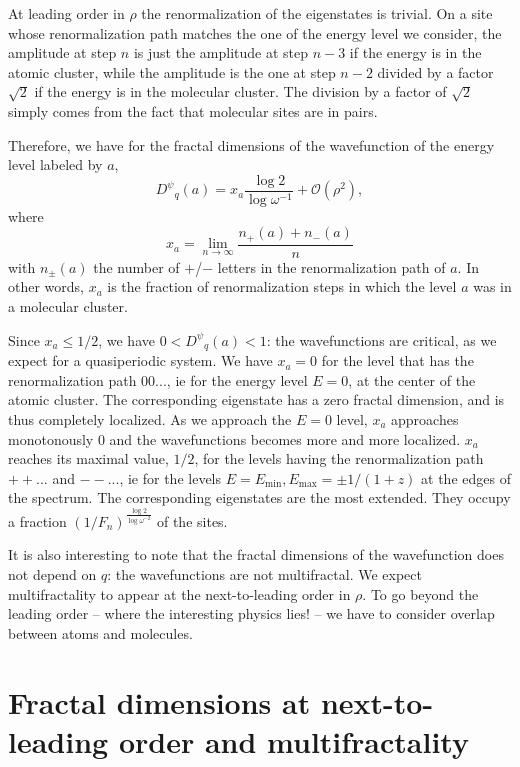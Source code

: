 \documentclass[aps,prl,preprint]{revtex4-1}
\newcommand{\wf}{\ensuremath{D^\psi}}
\begin{document}
At leading order in $\rho$ the renormalization of the eigenstates is trivial. 
On a site whose renormalization path matches the one of the energy level we consider, the amplitude at step $n$ is just the amplitude at step $n-3$ if the energy is in the atomic cluster, while the amplitude is the one at step $n-2$ divided by a factor $\sqrt{2}$ if the energy is in the molecular cluster.
The division by a factor of $\sqrt{2}$ simply comes from the fact that molecular sites are in pairs.

Therefore, we have for the fractal dimensions of the wavefunction of the energy level labeled by $a$,
\begin{equation}
\label{eq:dqpsi0}
	\wf_q(a) = x_a \frac{\log 2}{\log \omega^{-1}} + \mathcal{O}(\rho^2),
\end{equation}
where
\begin{equation}
	x_a = \lim_{n \rightarrow \infty} \frac{n_+(a)+n_-(a)}{n}
\end{equation}
with $n_\pm(a)$ the number of $+$/$-$ letters in the renormalization path of $a$.
In other words, $x_a$ is the fraction of renormalization steps in which the level $a$ was in a molecular cluster.

Since $x_a \leq 1/2$, we have $0 < \wf_q(a) < 1$: the wavefunctions are critical, as we expect for a quasiperiodic system.
We have $x_a = 0$ for the level that has the renormalization path $00...$, ie for the energy level $E=0$, at the center of the atomic cluster. The corresponding eigenstate has a zero fractal dimension, and is thus completely localized. As we approach the $E=0$ level, $x_a$ approaches monotonously $0$ and the wavefunctions becomes more and more localized.
$x_a$ reaches its maximal value, $1/2$, for the levels having the renormalization path $++...$ and $--...$, ie for the levels $E=E_\text{min}, E_\text{max} = \pm 1/(1+z)$ at the edges of the spectrum.
The corresponding eigenstates are the most extended. They occupy a fraction $(1/F_n)^{\frac{\log 2}{\log \omega^{-2}}}$ of the sites.

It is also interesting to note that the fractal dimensions of the wavefunction does not depend on $q$: the wavefunctions are not multifractal.
We expect multifractality to appear at the next-to-leading order in $\rho$.
To go beyond the leading order -- where the interesting physics lies! -- we have to consider overlap between atoms and molecules.

\section{Fractal dimensions at next-to-leading order and multifractality}
 
\end{document}
